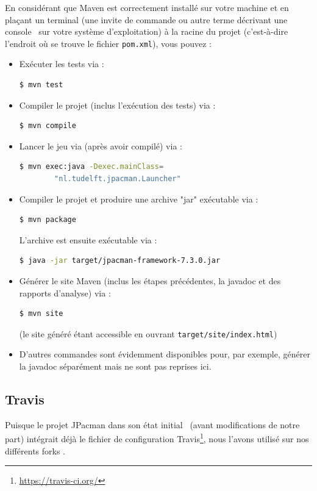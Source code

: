 \documentclass[12pt, openany]{report}
\begin{document}
En considérant que Maven est correctement installé sur votre machine et en plaçant un terminal (une invite de commande ou autre terme décrivant une \og console \fg \, sur votre système d'exploitation) à la racine du projet (c'est-à-dire l'endroit où se trouve le fichier \nolinkurl{pom.xml}), vous pouvez :
\begin{itemize}
	\item Exécuter les tests via :
	\begin{lstlisting}[language=bash]
	$ mvn test
	\end{lstlisting}
	\item Compiler le projet (inclus l'exécution des tests) via :
	\begin{lstlisting}[language=bash]
	$ mvn compile
	\end{lstlisting}
	\item Lancer le jeu via (après avoir compilé) via :
	\begin{lstlisting}[language=bash]
	$ mvn exec:java -Dexec.mainClass=
		"nl.tudelft.jpacman.Launcher"
	\end{lstlisting}
	\item Compiler le projet et produire une archive "jar" exécutable via :
	\begin{lstlisting}[language=bash]
	$ mvn package
	\end{lstlisting}
	L'archive est ensuite exécutable via :
	\begin{lstlisting}[language=bash]
	$ java -jar target/jpacman-framework-7.3.0.jar
	\end{lstlisting}
	\item Générer le site Maven (inclus les étapes précédentes, la javadoc et des rapports d'analyse) via :
	\begin{lstlisting}[language=bash]
	$ mvn site
	\end{lstlisting}
	(le site généré étant accessible en ouvrant \nolinkurl{target/site/index.html})
	\item D'autres commandes sont évidemment disponibles pour, par exemple, générer la javadoc séparément mais ne sont pas reprises ici.
\end{itemize}

\subsection{Travis}
Puisque le projet JPacman dans son état \og initial \fg \, (avant modifications de notre part) intégrait déjà le fichier de configuration Travis\footnote{\url{https://travis-ci.org/}}, nous l'avons utilisé sur nos différents \og forks \fg .
\end{document}
